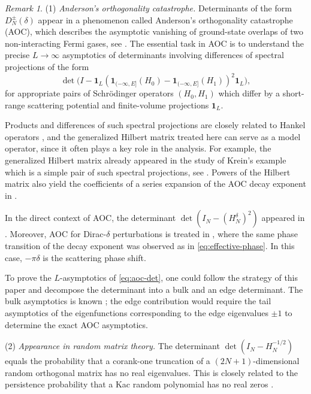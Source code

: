 \documentclass[11pt,a4paper,reqno]{amsart}
\theoremstyle{remark}
\newtheorem{remark}[theorem]{Remark}
\newcommand{\id}{I}
\begin{document}
\begin{remark}\label{rem:motivation}
(1) \emph{Anderson's orthogonality catastrophe.} Determinants of the form
$D_N^\pm(\delta)$ appear in a phenomenon called
Anderson's orthogonality catastrophe (AOC), which describes the
asymptotic vanishing of ground-state overlaps of two non-interacting Fermi
gases, see \cite{GebertKuttlerMuller,GebertKuttlerMullerOtte}. The essential
task in AOC is to understand the precise $L\to\infty$ asymptotics of determinants
involving differences of spectral projections of
the form
\begin{equation} \label{eq:aoc-det}
    \det\bigl( \id - \mathbf 1_L ( \mathbf 1_{(-\infty, E]} (H_0) - \mathbf 1_{(-\infty, E]} (H_1) )^2 \mathbf 1_L\bigr),
\end{equation}
for appropriate pairs of Schr\"odinger operators $(H_0, H_1)$ which differ by a short-range scattering potential and
finite-volume projections $\mathbf 1_L$.

Products and differences of such spectral projections
are closely related to Hankel operators \cite{FrankPushnitski}, and the generalized Hilbert matrix
treated here can serve as a model operator, since it often plays a key
role in the analysis. For example, the generalized Hilbert matrix already appeared in the
study of Krein's example which is a simple pair of such spectral
projections, see \cite{KostrykinMakarov}. Powers of the Hilbert matrix
also yield the coefficients of a series expansion of the AOC decay
exponent in \cite{GebertKuttlerMullerOtte}.

In the direct context of AOC, the determinant $\det(\id_N-(H_N^\delta)^2)$ appeared
in \cite{KnoerrOtteSpitzer}. Moreover, AOC for Dirac-$\delta$ perturbations is
treated in \cite{Gebert2015}, where the same phase transition of the decay
exponent was observed as in \eqref{eq:effective-phase}. In this case, $-\pi\delta$ is the scattering phase shift.

To prove the $L$-asymptotics of \eqref{eq:aoc-det}, one could follow the strategy of this paper and decompose the determinant into a bulk and an edge determinant. The bulk asymptotics is known \cite{FrankPushnitski}; the edge contribution would require the tail asymptotics of the eigenfunctions corresponding to the edge eigenvalues $\pm1$ to determine the exact AOC asymptotics.

(2) \emph{Appearance in random matrix theory.} The determinant
$\det(\id_N - H_N^{-1/2})$ equals the probability that a corank-one truncation of
a $(2N{+}1)$-dimensional random orthogonal matrix has no real eigenvalues. This
is closely related to the persistence probability that a Kac random polynomial
has no real zeros \cite{GebertPoplavskyi}.


\end{remark}
\end{document}
